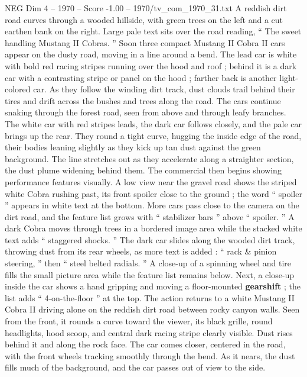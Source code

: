 \begin{textsample}{NEG Dim 4 – 1970 – Score -1.00 – 1970/tv\_com\_1970\_31.txt}  \label{ex:f4_neg_004}
A reddish dirt road curves through a wooded hillside, with green trees on the left and a cut earthen bank on the right.
Large pale text sits over the road reading, “ The sweet handling Mustang II Cobras. ” Soon three compact Mustang II Cobra II cars appear on the dusty road, moving in a line around a bend.
The lead car is white with bold red racing stripes running over the hood and roof ; behind it is a dark car with a contrasting stripe or panel on the hood ; farther back is another light-colored car.
As they follow the winding dirt track, dust clouds trail behind their tires and drift across the bushes and trees along the road.
The cars continue snaking through the forest road, seen from above and through leafy branches.
The white car with red stripes leads, the dark car follows closely, and the pale car brings up the rear.
They round a tight curve, hugging the inside edge of the road, their bodies leaning slightly as they kick up tan dust against the green background.
The line stretches out as they accelerate along a straighter section, the dust plume widening behind them.
The commercial then begins showing performance features visually.
A low view near the gravel road shows the striped white Cobra rushing past, its front spoiler close to the ground ; the word “ spoiler ” appears in white text at the bottom.
More cars pass close to the camera on the dirt road, and the feature list grows with “ stabilizer bars ” above “ spoiler. ” A dark Cobra moves through trees in a bordered image area while the stacked white text adds “ staggered shocks. ” The dark car slides along the wooded dirt track, throwing dust from its rear wheels, as more text is added : “ rack \& pinion steering, ” then “ steel belted radials. ” A close-up of a spinning wheel and tire fills the small picture area while the feature list remains below.
Next, a close-up inside the car shows a hand gripping and moving a floor-mounted \textbf{gearshift} ; the list adds “ 4-on-the-floor ” at the top.
The action returns to a white Mustang II Cobra II driving alone on the reddish dirt road between rocky canyon walls.
Seen from the front, it rounds a curve toward the viewer, its black grille, round headlights, hood scoop, and central dark racing stripe clearly visible.
Dust rises behind it and along the rock face.
The car comes closer, centered in the road, with the front wheels tracking smoothly through the bend.
As it nears, the dust fills much of the background, and the car passes out of view to the side.

\end{textsample}
